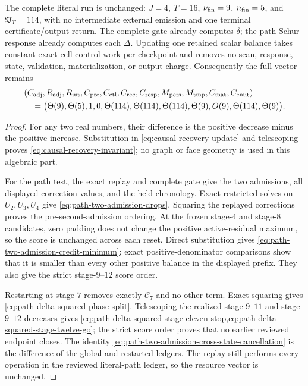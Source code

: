 \begin{proposition}
The complete literal run is unchanged:
$J=4$, $T=16$, $\nu_{\rm fin}=9$, $n_{\rm fin}=5$, and
$\mathfrak V_T=114$, with no intermediate external emission and one terminal
certificate/output return.  The complete gate already computes $\delta$; the
path Schur response already computes each $\Delta$.  Updating one retained
scalar balance takes constant exact-cell control work per checkpoint and
removes no scan, response, state, validation, materialization, or output
charge.  Consequently the full vector remains
\begin{equation}
 \begin{aligned}
 &(C_{\rm adj},R_{\rm adj},R_{\rm int},C_{\rm pre},C_{\rm ctl},C_{\rm rec},
 C_{\rm resp},M_{\rm pers},M_{\rm tmp},C_{\rm mat},C_{\rm emit})\\
 &\quad=\bigl(\Theta(9),\Theta(5),1,0,
       \Theta(114),\Theta(114),\Theta(114),
       \Theta(9),O(9),\Theta(114),\Theta(9)\bigr).
 \end{aligned}
 \label{eq:path-causal-two-admission-eleven-vector}
\end{equation}
\end{proposition}

\begin{proof}
For any two real numbers, their difference is the positive decrease minus the
positive increase.  Substitution in \cref{eq:causal-recovery-update} and
telescoping proves \cref{eq:causal-recovery-invariant}; no graph or face
geometry is used in this algebraic part.

For the path test, the exact replay and complete gate give the two admissions,
all displayed correction values, and the held chronology.  Exact restricted
solves on $U_2,U_3,U_4$ give \cref{eq:path-two-admission-drops}.  Squaring the
replayed corrections proves the pre-second-admission ordering.  At the frozen
stage-$4$ and stage-$8$ candidates, zero padding does not change the positive
active-residual maximum, so the score is unchanged across each reset.  Direct
substitution gives \cref{eq:path-two-admission-credit-minimum}; exact
positive-denominator comparisons show that it is smaller than every other
positive balance in the displayed prefix.  They also give the strict
stage-$9$--$12$ score order.

Restarting at stage $7$ removes exactly $\mathcal C_7$ and no other term.
Exact squaring gives \cref{eq:path-delta-squared-phase-split}.  Telescoping
the realized stage-$9$--$11$ and stage-$9$--$12$ decreases gives
\cref{eq:path-delta-squared-stage-eleven-stop,eq:path-delta-squared-stage-twelve-go};
the strict score order proves that no earlier reviewed endpoint closes.  The
identity \cref{eq:path-two-admission-cross-state-cancellation} is the
difference of the global and restarted ledgers.  The replay still performs
every operation in the reviewed literal-path ledger, so the resource vector
is unchanged.
\end{proof}

